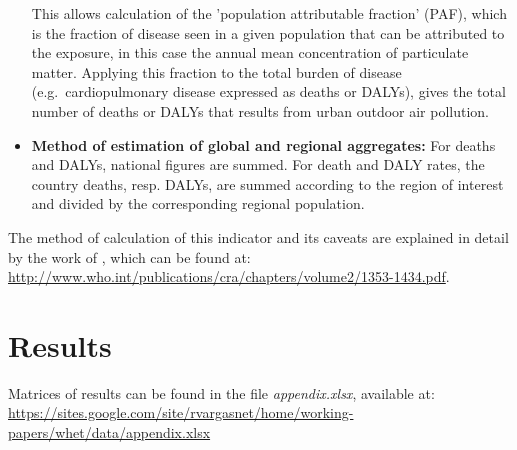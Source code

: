 \documentclass[a4paper,12pt]{article}
\begin{document}
\begin{itemize}
This allows calculation of the 'population attributable fraction' (PAF), which is the fraction of disease seen in a given population that can be attributed  to the exposure, in this case the annual mean concentration of particulate matter.
Applying this fraction to the total burden of disease (e.g.~cardiopulmonary disease expressed as deaths or DALYs), gives the total number of deaths or DALYs that results from urban outdoor air pollution.
\item \textbf{Method of estimation of global and regional aggregates:} For deaths and DALYs, national figures are summed. For death and DALY rates, the country deaths, resp. DALYs, are summed according to the region of interest and divided by the corresponding regional population.
\end{itemize}

\noindent The method of calculation of this indicator and its caveats are explained in detail by the work of \citet{cohenurban2004}, which can be found at: \\ \url{http://www.who.int/publications/cra/chapters/volume2/1353-1434.pdf}.

\section{Results}
\label{appendix:results}

Matrices of results can be found in the file \textit{appendix.xlsx}, available at:\\
\url{https://sites.google.com/site/rvargasnet/home/working-papers/whet/data/appendix.xlsx}


\end{document}

